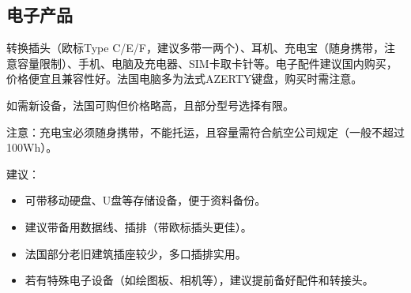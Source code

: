 \subsection{电子产品}

转换插头（欧标Type C/E/F，建议多带一两个）、耳机、充电宝（随身携带，注意容量限制）、手机、电脑及充电器、SIM卡取卡针等。电子配件建议国内购买，价格便宜且兼容性好。法国电脑多为法式AZERTY键盘，购买时需注意。

如需新设备，法国可购但价格略高，且部分型号选择有限。

注意：充电宝必须随身携带，不能托运，且容量需符合航空公司规定（一般不超过100Wh）。

建议：
\begin{itemize}
    \item 可带移动硬盘、U盘等存储设备，便于资料备份。
    \item 建议带备用数据线、插排（带欧标插头更佳）。
    \item 法国部分老旧建筑插座较少，多口插排实用。
    \item 若有特殊电子设备（如绘图板、相机等），建议提前备好配件和转接头。
\end{itemize}
